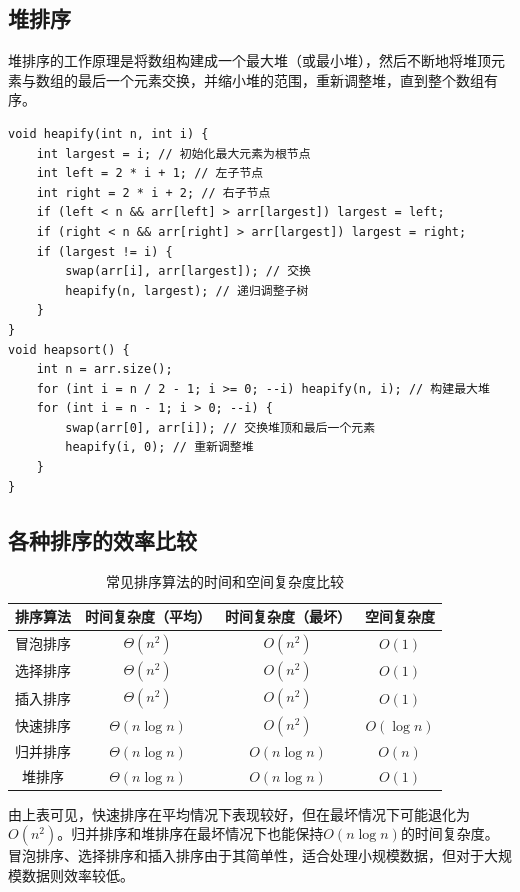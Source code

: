 \documentclass{article}
\begin{document}
\subsection{堆排序}

堆排序的工作原理是将数组构建成一个最大堆（或最小堆），然后不断地将堆顶元素与数组的最后一个元素交换，并缩小堆的范围，重新调整堆，直到整个数组有序。

\begin{lstlisting}
void heapify(int n, int i) {
    int largest = i; // 初始化最大元素为根节点
    int left = 2 * i + 1; // 左子节点
    int right = 2 * i + 2; // 右子节点
    if (left < n && arr[left] > arr[largest]) largest = left;
    if (right < n && arr[right] > arr[largest]) largest = right;
    if (largest != i) {
        swap(arr[i], arr[largest]); // 交换
        heapify(n, largest); // 递归调整子树
    }
}
void heapsort() {
    int n = arr.size();
    for (int i = n / 2 - 1; i >= 0; --i) heapify(n, i); // 构建最大堆
    for (int i = n - 1; i > 0; --i) {
        swap(arr[0], arr[i]); // 交换堆顶和最后一个元素
        heapify(i, 0); // 重新调整堆
    }
}
\end{lstlisting}

\subsection{各种排序的效率比较}

\begin{table}[ht]
  \centering
  \begin{tabular}{c|ccc}
    \hline
    排序算法 & 时间复杂度（平均） & 时间复杂度（最坏） & 空间复杂度 \\
    \hline
    冒泡排序 & $\Theta(n^2)$ & $O(n^2)$ & $O(1)$ \\
    选择排序 & $\Theta(n^2)$ & $O(n^2)$ & $O(1)$ \\
    插入排序 & $\Theta(n^2)$ & $O(n^2)$ & $O(1)$ \\
    快速排序 & $\Theta(n \log n)$ & $O(n^2)$ & $O(\log n)$ \\
    归并排序 & $\Theta(n \log n)$ & $O(n \log n)$ & $O(n)$ \\
    堆排序 & $\Theta(n \log n)$ & $O(n \log n)$ & $O(1)$ \\
    \hline
  \end{tabular}
  \caption{常见排序算法的时间和空间复杂度比较}
\end{table}

由上表可见，快速排序在平均情况下表现较好，但在最坏情况下可能退化为$O(n^2)$。归并排序和堆排序在最坏情况下也能保持$O(n \log n)$的时间复杂度。冒泡排序、选择排序和插入排序由于其简单性，适合处理小规模数据，但对于大规模数据则效率较低。
\end{document}
